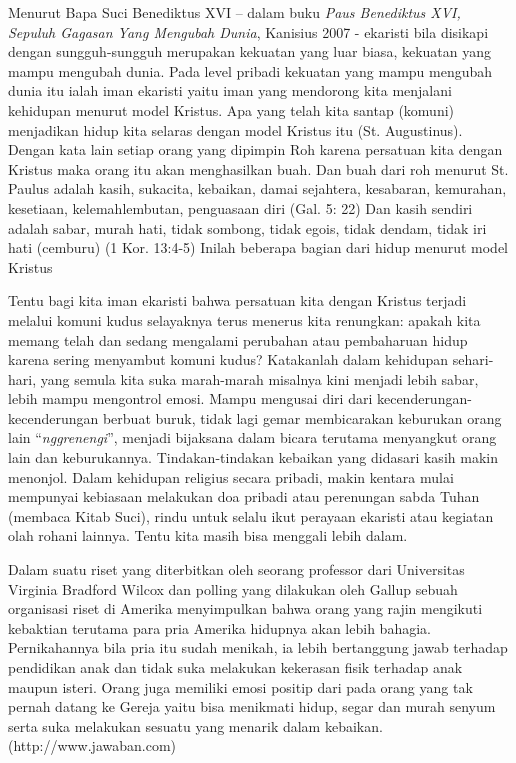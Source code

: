         Menurut Bapa Suci Benediktus XVI – dalam buku \textit{Paus Benediktus XVI, Sepuluh Gagasan Yang Mengubah Dunia}, Kanisius 2007 - ekaristi bila disikapi dengan sungguh-sungguh merupakan kekuatan yang luar biasa, kekuatan yang mampu mengubah dunia. Pada level pribadi kekuatan yang mampu mengubah dunia itu ialah iman ekaristi yaitu iman yang mendorong kita menjalani kehidupan menurut model Kristus. Apa yang telah kita santap (komuni) menjadikan hidup kita selaras dengan model Kristus itu (St. Augustinus). Dengan kata lain setiap orang yang dipimpin Roh karena persatuan kita dengan Kristus maka orang itu akan menghasilkan buah. Dan buah dari roh  menurut St. Paulus adalah kasih, sukacita, kebaikan, damai sejahtera, kesabaran, kemurahan, kesetiaan, kelemahlembutan, penguasaan diri (Gal. 5: 22) Dan kasih sendiri adalah sabar, murah hati, tidak sombong, tidak egois, tidak dendam, tidak iri hati (cemburu) (1 Kor. 13:4-5) Inilah beberapa  bagian dari hidup menurut model Kristus  

        Tentu bagi kita iman ekaristi bahwa persatuan kita dengan Kristus terjadi melalui komuni kudus selayaknya terus menerus kita renungkan: apakah kita memang telah dan sedang mengalami perubahan atau pembaharuan hidup karena sering menyambut komuni kudus? Katakanlah dalam kehidupan sehari-hari,  yang semula kita suka marah-marah misalnya kini menjadi lebih sabar, lebih mampu mengontrol emosi. Mampu mengusai diri dari kecenderungan-kecenderungan berbuat buruk, tidak lagi gemar membicarakan keburukan orang lain ``\textit{nggrenengi}'', menjadi bijaksana dalam bicara terutama menyangkut orang lain dan keburukannya. Tindakan-tindakan kebaikan yang didasari kasih makin menonjol.  Dalam kehidupan religius secara pribadi,  makin kentara mulai mempunyai kebiasaan melakukan doa pribadi atau perenungan sabda Tuhan (membaca Kitab Suci), rindu untuk selalu ikut perayaan ekaristi atau kegiatan olah rohani lainnya. Tentu kita masih bisa menggali lebih dalam.

         Dalam suatu riset yang diterbitkan oleh seorang professor dari Universitas Virginia Bradford Wilcox dan polling yang dilakukan oleh Gallup sebuah organisasi riset di Amerika menyimpulkan bahwa orang yang rajin mengikuti kebaktian terutama para pria Amerika hidupnya akan lebih bahagia. Pernikahannya bila pria itu sudah menikah, ia lebih bertanggung jawab terhadap pendidikan anak dan tidak suka melakukan kekerasan fisik terhadap anak maupun isteri. Orang juga memiliki emosi positip dari pada orang yang tak pernah datang ke Gereja yaitu bisa menikmati hidup, segar dan murah senyum serta suka melakukan sesuatu yang menarik dalam kebaikan.(http://www.jawaban.com)

